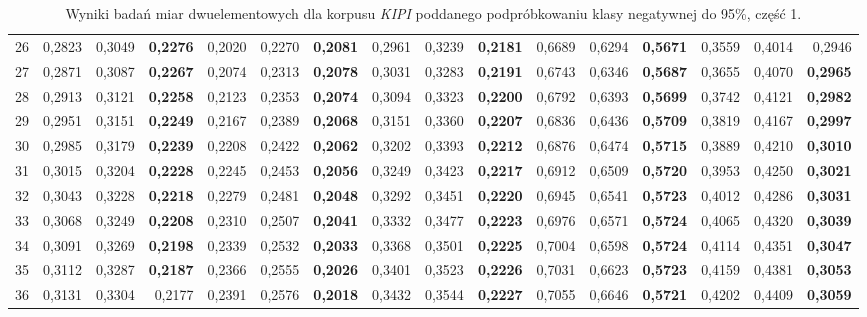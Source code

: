 \begin{table}[htp!]
\begin{adjustwidth}{-2cm}{}
\begin{tabular}{ l | *{15}{| r}}
26	&	0,2823	&	0,3049	&	\textbf{0,2276}	&	0,2020	&	0,2270	&	\textbf{0,2081}	&	0,2961	&	0,3239	&	\textbf{0,2181}	&	0,6689	&	0,6294	&	\textbf{0,5671}	&	0,3559	&	0,4014	&	0,2946	\\
27	&	0,2871	&	0,3087	&	\textbf{0,2267}	&	0,2074	&	0,2313	&	\textbf{0,2078}	&	0,3031	&	0,3283	&	\textbf{0,2191}	&	0,6743	&	0,6346	&	\textbf{0,5687}	&	0,3655	&	0,4070	&	\textbf{0,2965}	\\
28	&	0,2913	&	0,3121	&	\textbf{0,2258}	&	0,2123	&	0,2353	&	\textbf{0,2074}	&	0,3094	&	0,3323	&	\textbf{0,2200}	&	0,6792	&	0,6393	&	\textbf{0,5699}	&	0,3742	&	0,4121	&	\textbf{0,2982}	\\
29	&	0,2951	&	0,3151	&	\textbf{0,2249}	&	0,2167	&	0,2389	&	\textbf{0,2068}	&	0,3151	&	0,3360	&	\textbf{0,2207}	&	0,6836	&	0,6436	&	\textbf{0,5709}	&	0,3819	&	0,4167	&	\textbf{0,2997}	\\
30	&	0,2985	&	0,3179	&	\textbf{0,2239}	&	0,2208	&	0,2422	&	\textbf{0,2062}	&	0,3202	&	0,3393	&	\textbf{0,2212}	&	0,6876	&	0,6474	&	\textbf{0,5715}	&	0,3889	&	0,4210	&	\textbf{0,3010}	\\
31	&	0,3015	&	0,3204	&	\textbf{0,2228}	&	0,2245	&	0,2453	&	\textbf{0,2056}	&	0,3249	&	0,3423	&	\textbf{0,2217}	&	0,6912	&	0,6509	&	\textbf{0,5720}	&	0,3953	&	0,4250	&	\textbf{0,3021}	\\
32	&	0,3043	&	0,3228	&	\textbf{0,2218}	&	0,2279	&	0,2481	&	\textbf{0,2048}	&	0,3292	&	0,3451	&	\textbf{0,2220}	&	0,6945	&	0,6541	&	\textbf{0,5723}	&	0,4012	&	0,4286	&	\textbf{0,3031}	\\
33	&	0,3068	&	0,3249	&	\textbf{0,2208}	&	0,2310	&	0,2507	&	\textbf{0,2041}	&	0,3332	&	0,3477	&	\textbf{0,2223}	&	0,6976	&	0,6571	&	\textbf{0,5724}	&	0,4065	&	0,4320	&	\textbf{0,3039}	\\
34	&	0,3091	&	0,3269	&	\textbf{0,2198}	&	0,2339	&	0,2532	&	\textbf{0,2033}	&	0,3368	&	0,3501	&	\textbf{0,2225}	&	0,7004	&	0,6598	&	\textbf{0,5724}	&	0,4114	&	0,4351	&	\textbf{0,3047}	\\
35	&	0,3112	&	0,3287	&	\textbf{0,2187}	&	0,2366	&	0,2555	&	\textbf{0,2026}	&	0,3401	&	0,3523	&	\textbf{0,2226}	&	0,7031	&	0,6623	&	\textbf{0,5723}	&	0,4159	&	0,4381	&	\textbf{0,3053}	\\
36	&	0,3131	&	0,3304	&	0,2177	&	0,2391	&	0,2576	&	\textbf{0,2018}	&	0,3432	&	0,3544	&	\textbf{0,2227}	&	0,7055	&	0,6646	&	\textbf{0,5721}	&	0,4202	&	0,4409	&	\textbf{0,3059}	\\
	\bottomrule
\end{tabular}
 \end{adjustwidth}
\caption[Wyniki badań miar dwuelementowych dla korpusu \emph{KIPI} poddanego podpróbkowaniu klasy negatywnej do 95\%, część 1]{Wyniki badań miar dwuelementowych dla korpusu \emph{KIPI} poddanego podpróbkowaniu klasy negatywnej do 95\%, część 1.}
\label{KIPI_subsampled_5_part_1}
\end{table}

